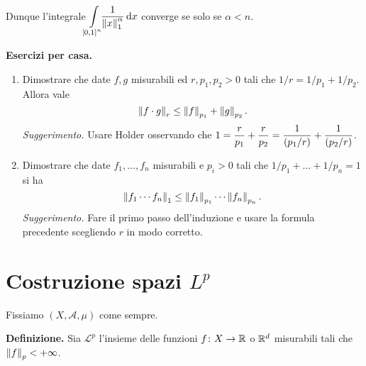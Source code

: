 \documentclass[a4paper, 12pt]{report}
\begin{document}
Dunque l'integrale $\ds \int\limits_{\mathclap{[0,1]^n}}^{} \frac{1}{\norm{x}_1^\alpha} \dd x$ converge se solo se $\alpha < n$.

\newpage

\textbf{Esercizi per casa.}
\begin{enumerate}[label=(\arabic*)]

\item Dimostrare che date $f,g$ misurabili ed $r,p_1,p_2 > 0$ tali che  $1 / r = 1 / p_1 + 1 / p_2$.
Allora vale
$$
	\left\lVert  f \cdot g  \right\rVert_r \leq \left\lVert  f  \right\rVert_{p_1} + \left\lVert  g  \right\rVert_{p_2}.
$$
\textit{Suggerimento.} Usare Holder osservando che $\displaystyle 1 = \frac{r}{p_1} + \frac{r}{p_2} = \frac{1}{\left( p_1/r \right)} + \frac{1}{\left( p_2/r \right)}$.

\item Dimostrare che date $f_1,\ldots, f_n$ misurabili e $p_i > 0$ tali che $1/p_1 + \ldots + 1/p_n = 1$ si ha
$$
	\left\lVert  f_1 \cdots f_n  \right\rVert_1 \leq \left\lVert  f_1  \right\rVert_{p_1} \cdots \left\lVert  f_n  \right\rVert_{p_n}.
$$
\textit{Suggerimento.} Fare il primo passo dell'induzione e usare la formula precedente scegliendo $r$ in modo corretto.

\end{enumerate}


%
%

\section{Costruzione spazi $L^p$}

Fissiamo $(X, \mathcal A, \mu)$ come sempre.

\textbf{Definizione.}
Sia $\mathscr L^p$ l'insieme delle funzioni $f \colon X \to \mathbb R$ o $\mathbb R^d$ misurabili tali che $\left\lVert f \right\rVert_p < +\infty$.
\end{document}
